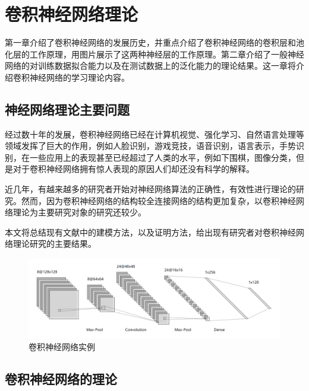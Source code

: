 \chapter{卷积神经网络理论}
\label{cha:theory}

第一章介绍了卷积神经网络的发展历史，并重点介绍了卷积神经网络的卷积层和池化层的工作原理，用图片展示了这两种神经层的工作原理。第二章介绍了一般神经网络的对训练数据拟合能力以及在测试数据上的泛化能力的理论结果。这一章将介绍卷积神经网络的学习理论内容。

\section{神经网络理论主要问题}
经过数十年的发展，卷积神经网络已经在计算机视觉\cite{krizhevsky2012imagenet}、强化学习\cite{silver2016mastering}、自然语言处理\cite{amari2003handbook}等领域发挥了巨大的作用，例如人脸识别\cite{lawrence1997face,parkhi2015deep}，游戏竞技\cite{oh2015action,silver2016mastering}，语音识别\cite{abdel2012applying,deng2013new,abdel2014convolutional}，语言表示\cite{hu2014convolutional,kalchbrenner2014convolutional}，手势识别\cite{molchanov2015hand}，在一些应用上的表现甚至已经超过了人类的水平，例如下围棋\cite{silver2016mastering}，图像分类\cite{he2016deep}，但是对于卷积神经网络拥有惊人表现的原因人们却还没有科学的解释。
\par
近几年，有越来越多的研究者开始对神经网络算法的正确性，有效性进行理论的研究\cite{du2018gradient,allen2019learning,li2018learning,allen2018convergence,brutzkus2017sgd,arora2019fine}。然而，因为卷积神经网络的结构较全连接网络的结构更加复杂，以卷积神经网络理论为主要研究对象的研究还较少。

\par
本文将总结现有文献中的建模方法，以及证明方法，给出现有研究者对卷积神经网络理论研究的主要结果。
\begin{figure}
\centering
\includegraphics[width=12cm]{./figures/nn.png}
\caption{卷积神经网络实例}
\label{fig:nn}
\end{figure}

\section{卷积神经网络的理论}
